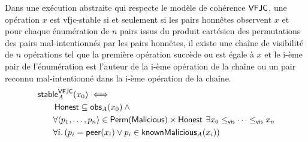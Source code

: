 \begin{theorem}\label{th:vfjc-stable}
Dans une exécution abstraite qui respecte le modèle de cohérence $\operatorname{\mathsf{VFJC}}$, une opération $x$ est vfjc-stable si et seulement si les pairs honnêtes observent $x$ et pour chaque énumération de $n$ pairs issus du produit cartésien des permutations des pairs mal-intentionnés par les pairs honnêtes, il existe une chaîne de visibilité de $n$ opérations tel que la première opération succède ou est égale à $x$ et le i-ème pair de l'énumération est l'auteur de la i-ème opération de la chaîne ou un pair reconnu mal-intentionné dans la i-ème opération de la chaîne.
\begin{equation*}\begin{split}
\MoveEqLeft\trm{stable}_A^{\trm{VFJC}}(x_0) \iff \\
    &\trm{Honest} \subseteq \trm{obs}_A(x_0) \:\land \\
    &\forall \tuple*{p_1,\dotsc, p_n} \in \trm{Perm}(\trm{Malicious}) \times \trm{Honest} \:\exists x_0 \viseq \dotsb \viseq x_n\\
    &\forall i \qsep (p_i = \trm{peer}(x_i) \lor p_i \in \trm{knownMalicious}_A(x_i))
\end{split}\end{equation*}
\end{theorem}



